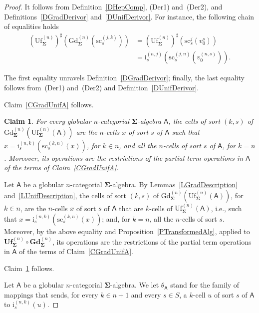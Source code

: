 \documentclass[a4paper, reqno
]{amsart}
\newcommand{\sig}[1]{\mathbf{#1}}             %
\newcommand{\calg}[1]{\boldsymbol{\mathsf{#1}}} %
\newcommand{\src}{\mathrm{sc}}
\newcommand{\Gd}{\mathrm{Gd}}
\newcommand{\Uf}{\mathrm{Uf}}
\newcommand{\bGd}{\mathbf{Gd}}
\newcommand{\bUf}{\mathbf{Uf}}
\theoremstyle{plain}
\newtheorem{claim}[theorem]{Claim}
\theoremstyle{definition}
\begin{document}
\begin{proof}
It follows from Definition~\ref{DHepComp}, (Der1) and~(Der2), and Definitions~\ref{DGradDerivor} and~\ref{DUnifDerivor}.
For instance, the following chain of equalities holds
\begin{align*}
\left(\Uf^{(n)}_{\sig{\Sigma}}\right)^{\sharp}\left(\Gd^{(n)}_{\sig{\Sigma}}\left(\src^{(j,k)}_{s}\right)\right)
&=
\left(\Uf^{(n)}_{\sig{\Sigma}}\right)^{\sharp}\left(\src^{j}_{s}(v^{s}_{0})\right)
\tag{1}
\\&=
\mathrm{i}^{(n,j)}_{s}\left(\src^{(j,n)}_{s}(v^{(n,s)}_{0})\right).
\tag{2}
\end{align*}

The first equality unravels Definition~\ref{DGradDerivor}; finally, the last equality follows from~(Der1) and~(Der2) and Definition~\ref{DUnifDerivor}.

Claim~\ref{CGradUnifA} follows.

\begin{claim}\label{CGradUnifB}
For every globular $n$-categorial $\sig{\Sigma}$-algebra $\calg{A}$, the cells of sort $(k,s)$ of $\Gd^{(n)}_{\sig{\Sigma}}(\Uf^{(n)}_{\sig{\Sigma}}(\calg{A}))$ are the $n$-cells $x$ of sort $s$ of $\calg{A}$ such that $x=\mathrm{i}^{(n,k)}_{s}(\src^{(k,n)}_{s}(x))$, for $k\in n$, and all the $n$-cells of sort $s$ of $\calg{A}$, for $k=n$.
Moreover, its operations are the restrictions of the partial term operations in $\calg{A}$ of the terms of Claim~\ref{CGradUnifA}.
\end{claim}

Let $\calg{A}$ be a globular $n$-categorial $\sig{\Sigma}$-algebra.
By Lemmas~\ref{LGradDescription} and~\ref{LUnifDescription}, the cells of sort $(k,s)$ of $\Gd^{(n)}_{\sig{\Sigma}}(\Uf^{(n)}_{\sig{\Sigma}}(\calg{A}))$, for $k\in n$, are the $n$-cells $x$ of sort $s$ of $\calg{A}$ that are $k$-cells of $\Uf^{(n)}_{\sig{\Sigma}}(\calg{A})$, i.e., such that $x=\mathrm{i}^{(n,k)}_{s}(\src^{(k,n)}_{s}(x))$; and, for $k=n$, all the $n$-cells of sort $s$.
Moreover, by the above equality and Proposition~\ref{PTransformedAlg}, applied to $\bUf^{(n)}_{\sig{\Sigma}}\circ\bGd^{(n)}_{\sig{\Sigma}}$, its operations are the restrictions of the partial term operations in $\calg{A}$ of the terms of Claim~\ref{CGradUnifA}.

Claim~\ref{CGradUnifB} follows.

Let $\calg{A}$ be a globular $n$-categorial $\sig{\Sigma}$-algebra.
We let $\theta_{\calg{A}}$ stand for the family of mappings that sends, for every $k\in n+1$ and every $s\in S$, a $k$-cell $u$ of sort $s$ of $\calg{A}$ to $\mathrm{i}^{(n,k)}_{s}(u)$.


\end{proof}
\end{document}
